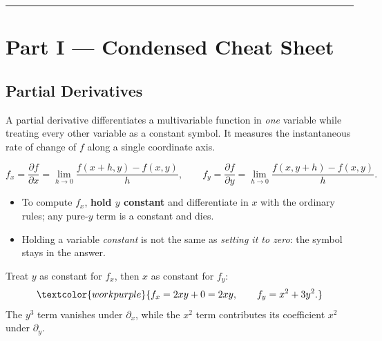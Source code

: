 \vspace{0.6em}
\hrule
\vspace{0.6em}

{}
\section*{Part I --- Condensed Cheat Sheet}
\setcounter{section}{6}   %

\subsection{Partial Derivatives}

A partial derivative differentiates a multivariable function in \emph{one}
variable while treating every other variable as a constant symbol. It measures
the instantaneous rate of change of $f$ along a single coordinate axis.

\begin{formulabox}
\[ f_x = \frac{\partial f}{\partial x} = \lim_{h\to 0}\frac{f(x+h,y)-f(x,y)}{h},
   \qquad
   f_y = \frac{\partial f}{\partial y} = \lim_{h\to 0}\frac{f(x,y+h)-f(x,y)}{h}. \]
\begin{itemize}[leftmargin=1.4em, itemsep=2pt]
    \item To compute $f_x$, \textbf{hold $y$ constant} and differentiate in $x$
          with the ordinary rules; any pure-$y$ term is a constant and dies.
    \item Holding a variable \emph{constant} is not the same as
          \emph{setting it to zero}: the symbol stays in the answer.
\end{itemize}
\end{formulabox}

\begin{examplebox}[Worked Example 6.1: First partials of $f=x^2y+y^3$]
Treat $y$ as constant for $f_x$, then $x$ as constant for $f_y$:
\[ \textcolor{workpurple}{f_x = 2xy + 0 = 2xy, \qquad f_y = x^2 + 3y^2.} \]
The $y^3$ term vanishes under $\partial_x$, while the $x^2$ term contributes its
coefficient $x^2$ under $\partial_y$.
\end{examplebox}

